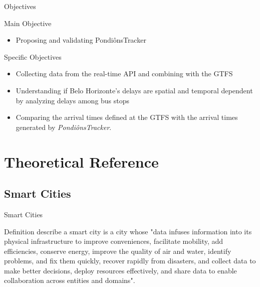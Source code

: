 \documentclass[xcolor=dvipsnames,table]{beamer}
\begin{document}
\begin{frame}{Objectives}
        \begin{block}{Main Objective}
                \begin{itemize}
                        \item Proposing and validating PondiônsTracker
                \end{itemize}
        \end{block}
        \begin{block}{Specific Objectives}
                \begin{itemize}
                        \item Collecting data from the real-time API and combining with the GTFS
                        \item Understanding if Belo Horizonte's delays are spatial and temporal dependent by analyzing delays among bus stops
                        \item Comparing the arrival times defined at the GTFS with the arrival times generated by \textit{PondiônsTracker}.
                \end{itemize}
        \end{block}
\end{frame}


\section{Theoretical Reference}
\subsection{Smart Cities}
\begin{frame}{Smart Cities}
        \begin{block}{Definition}
                \citealt{pardo2011} describe
                a smart city is a city whose "data infuses information into its physical infrastructure to improve
                conveniences, facilitate mobility, add efficiencies, conserve energy,
                improve the quality of air and water, identify problems, and fix them
                quickly, recover rapidly from disasters, and collect data to make better
                decisions, deploy resources effectively, and share data to enable
                collaboration across entities and domains".
        \end{block}
\end{frame}
\end{document}
